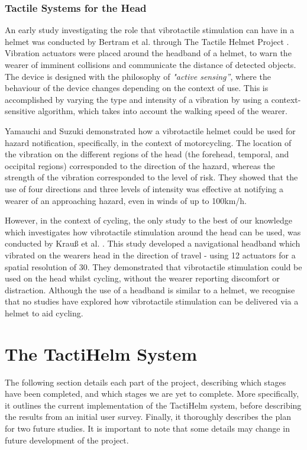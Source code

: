 \documentclass{mpaper}
\begin{document}
\subsubsection{Tactile Systems for the Head}
An early study investigating the role that vibrotactile stimulation can have in a helmet was conducted by Bertram et al. through The Tactile Helmet Project \cite{10.1007/978-3-642-39802-5_3}. Vibration actuators were placed around the headband of a helmet, to warn the wearer of imminent collisions and communicate the distance of detected objects. The device is designed with the philosophy of \textit{"active sensing”}, where the behaviour of the device changes depending on the context of use. This is accomplished by varying the type and intensity of a vibration by using a context-sensitive algorithm, which takes into account the walking speed of the wearer.

Yamauchi and Suzuki \cite{yamauchi2020vibro} demonstrated how a vibrotactile helmet could be used for hazard notification, specifically, in the context of motorcycling. The location of the vibration on the different regions of the head (the forehead, temporal, and occipital regions) corresponded to the direction of the hazard, whereas the strength of the vibration corresponded to the level of risk. They showed that the use of four directions and three levels of intensity was effective at notifying a wearer of an approaching hazard, even in winds of up to 100km/h.

However, in the context of cycling, the only study to the best of our knowledge which investigates how vibrotactile stimulation around the head can be used, was conducted by Krau{\ss} et al. \cite{krauss2021head}. This study developed a navigational headband which vibrated on the wearers head in the direction of travel - using 12 actuators for a spatial resolution of 30\degree{}. They demonstrated that vibrotactile stimulation could be used on the head whilst cycling, without the wearer reporting discomfort or distraction. Although the use of a headband is similar to a helmet, we recognise that no studies have explored how vibrotactile stimulation can be delivered via a helmet to aid cycling.


\section{The TactiHelm System}

The following section details each part of the project, describing which stages have been completed, and which stages we are yet to complete. More specifically, it outlines the current implementation of the TactiHelm system, before describing the results from an initial user survey. Finally, it thoroughly describes the plan for two future studies. It is important to note that some details may change in future development of the project.
\end{document}
